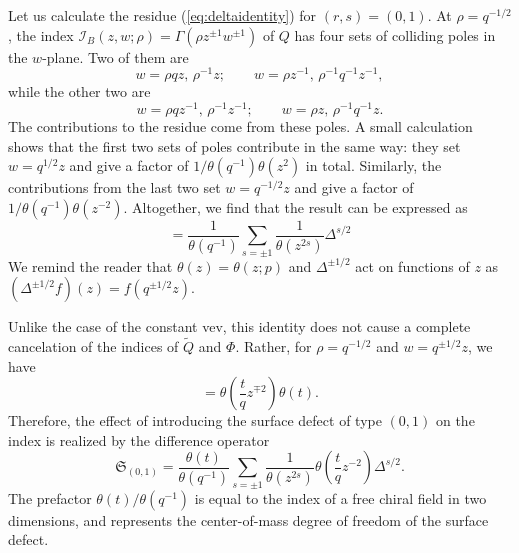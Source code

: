 Let us calculate the residue (\ref{eq:deltaidentity}) for $(r,s)=(0,1)$.
At $\rho=q^{-1/2}$, the index $\mathcal{I}_{B}(z,w;\rho)=\Gamma(\rho z^{\pm1}w^{\pm1})$
of $Q$ has four sets of colliding poles in the $w$-plane. Two of
them are 
\begin{equation}
    w  =  \rho qz,  \,  \rho^{-1}z;  
    \quad\quad  
    w  =  \rho z^{-1},  \,  \rho^{-1}q^{-1}z^{-1},
\end{equation}
 while the other two are 
\begin{equation}
    w  =  \rho qz^{-1},  \,  \rho^{-1}z^{-1};  
    \quad\quad  
    w  =  \rho z,  \,  \rho^{-1}q^{-1}z.
\end{equation}
 The contributions to the residue come from these poles. A small calculation
shows that the first two sets of poles contribute in the same way:
they set $w=q^{1/2}z$ and give a factor of $1/\theta(q^{-1})\theta(z^{2})$
in total. Similarly, the contributions from the last two set $w=q^{-1/2}z$
and give a factor of $1/\theta(q^{-1})\theta(z^{-2})$. Altogether,
we find that the result can be expressed as 
\begin{equation}
=\frac{1}{\theta(q^{-1})}\sum_{s=\pm1}\frac{1}{\theta(z^{2s})}\Delta^{s/2}
\end{equation}
 We remind the reader that $\theta(z)=\theta(z;p)$ and $\Delta^{\pm1/2}$
act on functions of $z$ as $\left(\Delta^{\pm1/2}f\right)(z)=f(q^{\pm1/2}z)$.

Unlike the case of the constant vev, this identity does not cause
a complete cancelation of the indices of $\tilde{Q}$ and $\Phi$.
Rather, for $\rho=q^{-1/2}$ and $w=q^{\pm1/2}z$, we have 
\begin{equation}
=\theta\left(\frac{t}{q}z^{\mp2}\right)\theta(t).
\end{equation}
Therefore, the effect of introducing the surface defect of type $(0,1)$
on the index is realized by the difference operator
\begin{equation}
    \mathfrak{S}_{(0,1)}  
      =  
        \frac{\theta(t)}{\theta(q^{-1})}
        \sum_{s=\pm1}  \frac{1}{\theta(z^{2s})}
        \theta\left(  \frac{t}{q}z^{-2}  \right)    \Delta^{s/2}.  \label{eq:surfacedefectaction}
\end{equation}
 The prefactor $\theta(t)/\theta(q^{-1})$ is equal to the index of
a free chiral field in two dimensions, and represents the center-of-mass
degree of freedom of the surface defect.

